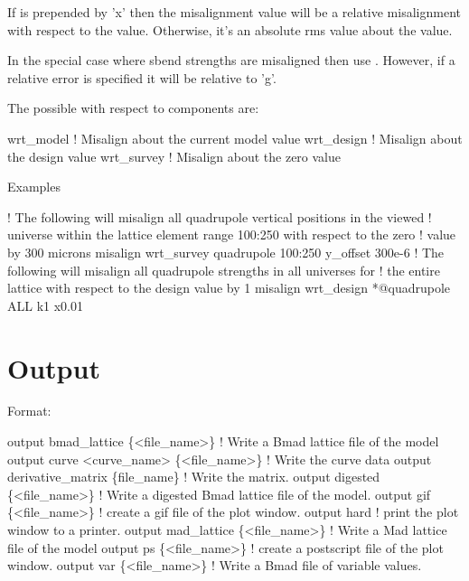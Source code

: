 If  is prepended by 'x' then the misalignment value will be
a relative misalignment with respect to the  value. Otherwise, it's an 
absolute rms value about the  value.

In the special case where sbend strengths are misaligned then use
. However, if a relative error is specified it will be 
relative to 'g'.

The possible with respect to components are:
\begin{example}
  wrt_model          ! Misalign about the current model value
  wrt_design         ! Misalign about the design value
  wrt_survey         ! Misalign about the zero value
\end{example}

Examples
\begin{example}
   ! The following will misalign all quadrupole vertical positions in the viewed
   ! universe within the lattice element range 100:250 with respect to the zero 
   ! value by 300 microns
  misalign wrt_survey quadrupole 100:250 y_offset 300e-6
   ! The following will misalign all quadrupole strengths in all universes for
   ! the entire lattice with respect to the design value by 1%
  misalign wrt_design *@quadrupole ALL k1 x0.01
\end{example}

\section{Output}
\label{s:output}

Format:
\begin{example}
  output bmad_lattice \{<file_name>\} ! Write a Bmad lattice file of the model
  output curve <curve_name> \{<file_name>\} ! Write the curve data
  output derivative_matrix \{file_name\}    ! Write the  matrix.
  output digested \{<file_name>\}     ! Write a digested Bmad lattice file of the model.
  output gif \{<file_name>\}          ! create a gif file of the plot window.
  output hard                       ! print the plot window to a printer.
  output mad_lattice \{<file_name>\}  ! Write a Mad lattice file of the model
  output ps \{<file_name>\}           ! create a postscript file of the plot window.
  output var \{<file_name>\}          ! Write a Bmad file of variable values.
\end{example}

